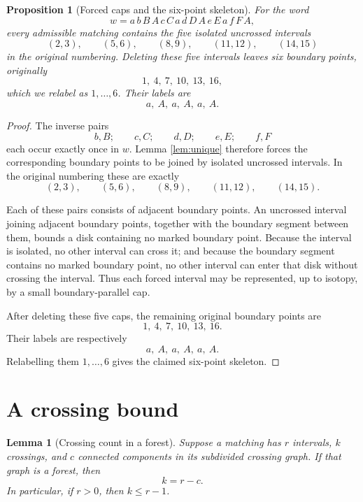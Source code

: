 \documentclass[12pt]{article}
\newtheorem{proposition}[theorem]{Proposition}
\newtheorem{lemma}[theorem]{Lemma}
\theoremstyle{definition}
\begin{document}
\begin{proposition}[Forced caps and the six-point skeleton]\label{prop:forcedcaps}
For the word
\[
w=a\,b\,B\,A\,c\,C\,a\,d\,D\,A\,e\,E\,a\,f\,F\,A,
\]
every admissible matching contains the five isolated uncrossed intervals
\[
(2,3),\qquad (5,6),\qquad (8,9),\qquad (11,12),\qquad (14,15)
\]
in the original numbering.  Deleting these five intervals leaves six boundary points, originally
\[
1,\ 4,\ 7,\ 10,\ 13,\ 16,
\]
which we relabel as \(1,\dots,6\).  Their labels are
\[
a,\ A,\ a,\ A,\ a,\ A.
\]
\end{proposition}

\begin{proof}
The inverse pairs
\[
b,B;\qquad c,C;\qquad d,D;\qquad e,E;\qquad f,F
\]
each occur exactly once in \(w\).  Lemma \ref{lem:unique} therefore forces the corresponding boundary points to be joined by isolated uncrossed intervals.  In the original numbering these are exactly
\[
(2,3),\qquad (5,6),\qquad (8,9),\qquad (11,12),\qquad (14,15).
\]

Each of these pairs consists of adjacent boundary points.  An uncrossed interval joining adjacent boundary points, together with the boundary segment between them, bounds a disk containing no marked boundary point.  Because the interval is isolated, no other interval can cross it; and because the boundary segment contains no marked boundary point, no other interval can enter that disk without crossing the interval.  Thus each forced interval may be represented, up to isotopy, by a small boundary-parallel cap.

After deleting these five caps, the remaining original boundary points are
\[
1,\ 4,\ 7,\ 10,\ 13,\ 16.
\]
Their labels are respectively
\[
a,\ A,\ a,\ A,\ a,\ A.
\]
Relabelling them \(1,\dots,6\) gives the claimed six-point skeleton.
\end{proof}

\section{A crossing bound}

\begin{lemma}[Crossing count in a forest]\label{lem:crosscount}
Suppose a matching has \(r\) intervals, \(k\) crossings, and \(c\) connected components in its subdivided crossing graph.  If that graph is a forest, then
\[
k=r-c.
\]
In particular, if \(r>0\), then \(k\le r-1\).
\end{lemma}
\end{document}
